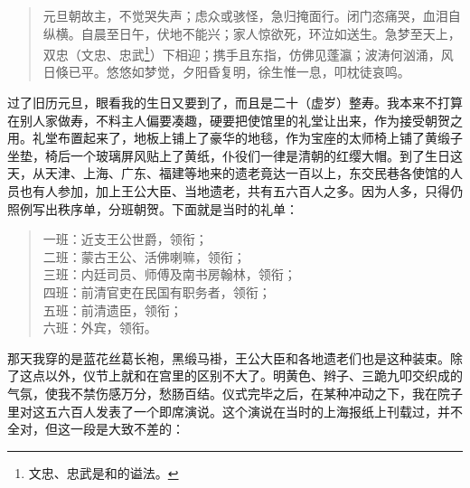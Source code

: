 \begin{quote}
	元旦朝故主，不觉哭失声；虑众或骇怪，急归掩面行。闭门恣痛哭，血泪自纵横。自晨至日午，伏地不能兴；家人惊欲死，环泣如送生。急梦至天上，双忠（文忠、忠武\footnote{文忠、忠武是和的谥法。}）下相迎；携手且东指，仿佛见蓬瀛；波涛何汹涌，风日倏已平。悠悠如梦觉，夕阳昏复明，徐生惟一息，叩枕徒哀鸣。\\
\end{quote}

过了旧历元旦，眼看我的生日又要到了，而且是二十（虚岁）整寿。我本来不打算在别人家做寿，不料主人偏要凑趣，硬要把使馆里的礼堂让出来，作为接受朝贺之用。礼堂布置起来了，地板上铺上了豪华的地毯，作为宝座的太师椅上铺了黄缎子坐垫，椅后一个玻璃屏风贴上了黄纸，仆役们一律是清朝的红缨大帽。到了生日这天，从天津、上海、广东、福建等地来的遗老竟达一百以上，东交民巷各使馆的人员也有人参加，加上王公大臣、当地遗老，共有五六百人之多。因为人多，只得仍照例写出秩序单，分班朝贺。下面就是当时的礼单：\\

\begin{quote}
	一班：近支王公世爵，领衔；\\

二班：蒙古王公、活佛喇嘛，领衔；\\

三班：内廷司员、师傅及南书房翰林，领衔；\\

四班：前清官吏在民国有职务者，领衔；\\

五班：前清遗臣，领衔；\\

六班：外宾，领衔。\\
\end{quote}

那天我穿的是蓝花丝葛长袍，黑缎马褂，王公大臣和各地遗老们也是这种装束。除了这点以外，仪节上就和在宫里的区别不大了。明黄色、辫子、三跪九叩交织成的气氛，使我不禁伤感万分，愁肠百结。仪式完毕之后，在某种冲动之下，我在院子里对这五六百人发表了一个即席演说。这个演说在当时的上海报纸上刊载过，并不全对，但这一段是大致不差的：\\

